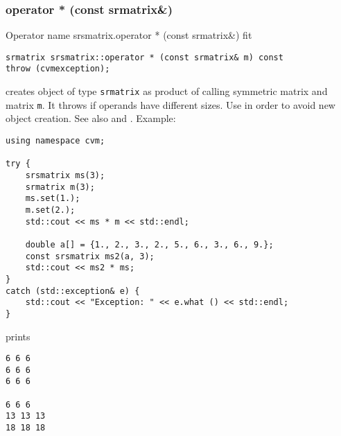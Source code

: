 \subsubsection{operator * (const srmatrix\&)}
Operator%
\pdfdest name {srsmatrix.operator * (const srmatrix&)} fit
\begin{verbatim}
srmatrix srsmatrix::operator * (const srmatrix& m) const
throw (cvmexception);
\end{verbatim}
creates  object of type \verb"srmatrix"
as  product of  calling symmetric matrix and  matrix \verb"m".
It throws  
if  operands have different sizes.
Use  in order to avoid
 new object creation.
See also
 and .
Example:
\begin{Verbatim}
using namespace cvm;

try {
    srsmatrix ms(3);
    srmatrix m(3);
    ms.set(1.);
    m.set(2.);
    std::cout << ms * m << std::endl;

    double a[] = {1., 2., 3., 2., 5., 6., 3., 6., 9.};
    const srsmatrix ms2(a, 3);
    std::cout << ms2 * ms;
}
catch (std::exception& e) {
    std::cout << "Exception: " << e.what () << std::endl;
}
\end{Verbatim}
prints
\begin{Verbatim}
6 6 6
6 6 6
6 6 6

6 6 6
13 13 13
18 18 18
\end{Verbatim}
\newpage





